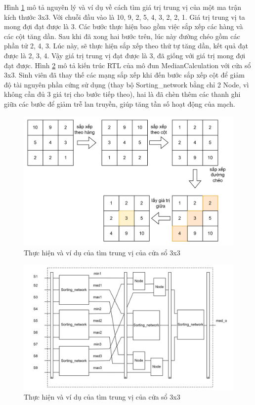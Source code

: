 Hình \ref{fig:median3x3Exampel} mô tả nguyên lý và ví dụ về cách tìm giá trị trung vị của một ma trận kích thước 3x3. Với chuỗi đầu vào là 10, 9, 2, 5, 4, 3, 2, 2, 1. Giá trị trung vị ta mong đợi đạt được là 3. Các bước thực hiện bao gồm việc sắp xếp các hàng và các cột tăng dần. Sau khi đã xong hai bước trên, lúc này đường chéo gồm các phần tử 2, 4, 3. Lúc này, sẽ thực hiện sắp xếp theo thứ tự tăng dần, kết quả đạt được là 2, 3, 4. Vậy giá trị trung vị đạt được là 3, đã giống với giá trị mong đợi đạt được.  Hình \ref{fig:median3x3RTL} mô tả kiến trúc RTL của mô đun MedianCalculation với cửa sổ 3x3. Sinh viên đã thay thế các mạng sắp xếp khi đến bước sắp xếp cột để giảm độ tài nguyên phần cứng sử dụng (thay bộ Sorting\_network bằng chỉ 2 Node, vì không cần đủ 3 giá trị cho bước tiếp theo), hai là đã chèn thêm các thanh ghi giữa các bước để giảm trễ lan truyền, giúp tăng tần số hoạt động của mạch.
\begin{figure}[!ht]
	\centering
	\includegraphics[width=0.6\linewidth]{figures/median3x3Exampel.png}
	\caption{Thực hiện và ví dụ của tìm trung vị của cửa sổ 3x3}
	\label{fig:median3x3Exampel}
\end{figure}
\begin{figure}[H]
	\centering
	\includegraphics[width=\linewidth]{figures/median3x3RTL.png}
	\caption{Thực hiện và ví dụ của tìm trung vị của cửa sổ 3x3}
	\label{fig:median3x3RTL}
\end{figure}

